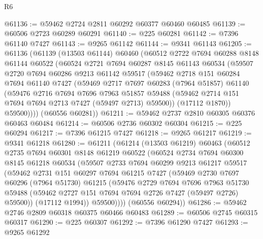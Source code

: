 \begin{lexlean}{R6}
\begin{coremodule}
@61136 := @59462 @2724 @2811 @60292 @60377 @60460 @60485
@61139 := @60506 @2723 @60289 @60291
@61140 := @225 @60281
@61142 := @7396 @61140 @7427
@61143 := @9265 @61142
@61144 := @9341 @61143
@61205 := @61136
    (@61139
      (@13503 @61144)
      @60460
      (@60512
        @2722
        @7694
        @60288
        @8148
        @61144
        @60522
        (@60524
          @2721
          @7694
          @60287
          @8145
          @61143
          @60534
          (@59507
            @2720
            @7694
            @60286
            @9213
            @61142
            @59517
            (@59462
              @2718
              @151
              @60284
              @7694
              @61140
              @7427
              (@59469
                @2717
                @7697
                @60283
                (@7964 @51857)
                @61140
                (@59476
                  @2716
                  @7694
                  @7696
                  @7963
                  @51857
                  @59488
                  (@59462 @2714 @151 @7694 @7694 @2713 @7427 (@59497 @2713) @59500))
                (@17112 @1870))
              @59500))))
      (@60556 @60281))
@61211 := @59462 @2737 @2810 @60305 @60376 @60463 @60484
@61214 := @60506 @2736 @60302 @60304
@61215 := @225 @60294
@61217 := @7396 @61215 @7427
@61218 := @9265 @61217
@61219 := @9341 @61218
@61280 := @61211
    (@61214
      (@13503 @61219)
      @60463
      (@60512
        @2735
        @7694
        @60301
        @8148
        @61219
        @60522
        (@60524
          @2734
          @7694
          @60300
          @8145
          @61218
          @60534
          (@59507
            @2733
            @7694
            @60299
            @9213
            @61217
            @59517
            (@59462
              @2731
              @151
              @60297
              @7694
              @61215
              @7427
              (@59469
                @2730
                @7697
                @60296
                (@7964 @51730)
                @61215
                (@59476
                  @2729
                  @7694
                  @7696
                  @7963
                  @51730
                  @59488
                  (@59462 @2727 @151 @7694 @7694 @2726 @7427 (@59497 @2726) @59500))
                (@17112 @1994))
              @59500))))
      (@60556 @60294))
@61286 := @59462 @2746 @2809 @60318 @60375 @60466 @60483
@61289 := @60506 @2745 @60315 @60317
@61290 := @225 @60307
@61292 := @7396 @61290 @7427
@61293 := @9265 @61292

\end{coremodule}
\end{lexlean}

